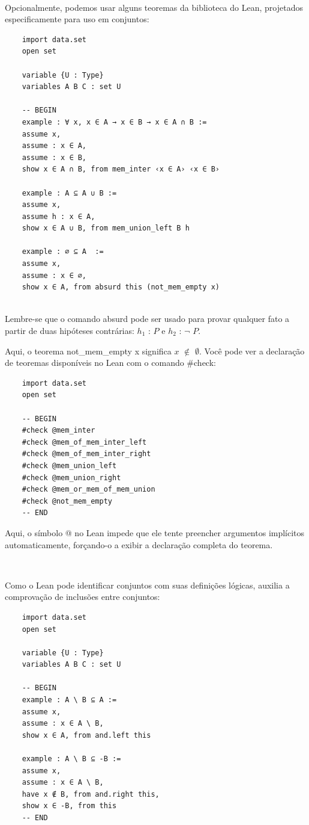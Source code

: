 $\qquad$

Opcionalmente, podemos usar alguns teoremas da biblioteca do Lean, projetados especificamente para uso em conjuntos:

\begin{lstlisting}
    import data.set
    open set

    variable {U : Type}
    variables A B C : set U

    -- BEGIN
    example : ∀ x, x ∈ A → x ∈ B → x ∈ A ∩ B :=
    assume x,
    assume : x ∈ A,
    assume : x ∈ B,
    show x ∈ A ∩ B, from mem_inter ‹x ∈ A› ‹x ∈ B›

    example : A ⊆ A ∪ B :=
    assume x,
    assume h : x ∈ A,
    show x ∈ A ∪ B, from mem_union_left B h

    example : ∅ ⊆ A  :=
    assume x,
    assume : x ∈ ∅,
    show x ∈ A, from absurd this (not_mem_empty x)
 
\end{lstlisting}

Lembre-se que o comando{
\selectfont absurd} pode ser usado para provar qualquer fato a partir de duas hipóteses contrárias: $h_1$ : $P$ e $h_2$ : $\neg$ $P$. 

Aqui, o teorema {
\selectfont not\_mem\_empty x} significa $x$ $\notin$ $\emptyset$. Você pode ver a declaração de teoremas disponíveis no Lean com o comando{
\selectfont \#check}:

\begin{lstlisting}
    import data.set
    open set

    -- BEGIN
    #check @mem_inter
    #check @mem_of_mem_inter_left
    #check @mem_of_mem_inter_right
    #check @mem_union_left
    #check @mem_union_right
    #check @mem_or_mem_of_mem_union
    #check @not_mem_empty
    -- END

\end{lstlisting}

Aqui, o símbolo{
\selectfont @} no Lean impede que ele tente preencher argumentos implícitos automaticamente, forçando-o a exibir a declaração completa do teorema.

$\qquad$

Como o Lean pode identificar conjuntos com suas definições lógicas, auxilia a comprovação de inclusões entre conjuntos:

\begin{lstlisting}
    import data.set
    open set

    variable {U : Type}
    variables A B C : set U

    -- BEGIN
    example : A \ B ⊆ A :=
    assume x,
    assume : x ∈ A \ B,
    show x ∈ A, from and.left this

    example : A \ B ⊆ -B :=
    assume x,
    assume : x ∈ A \ B,
    have x ∉ B, from and.right this,
    show x ∈ -B, from this
    -- END

\end{lstlisting}


